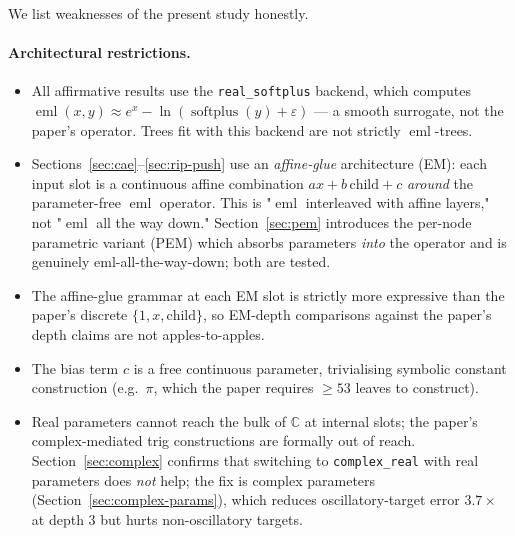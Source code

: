 \documentclass[11pt]{article}
\newcommand{\eml}{\operatorname{eml}}
\begin{document}
We list weaknesses of the present study honestly.

\paragraph{Architectural restrictions.}
\begin{itemize}
\item All affirmative results use the \texttt{real\_softplus} backend, which
  computes $\eml(x,y) \approx e^x - \ln(\operatorname{softplus}(y) + \varepsilon)$
  --- a smooth surrogate, not the paper's operator. Trees fit with this
  backend are not strictly $\eml$-trees.
\item Sections~\ref{sec:cae}--\ref{sec:rip-push} use an \emph{affine-glue}
  architecture (EM): each input slot is a continuous affine combination
  $a x + b\,\text{child} + c$ \emph{around} the parameter-free $\eml$ operator.
  This is "$\eml$ interleaved with affine layers," not "$\eml$ all the way
  down." Section~\ref{sec:pem} introduces the per-node parametric variant
  (PEM) which absorbs parameters \emph{into} the operator and is genuinely
  eml-all-the-way-down; both are tested.
\item The affine-glue grammar at each EM slot is strictly more expressive
  than the paper's discrete $\{1, x, \text{child}\}$, so EM-depth comparisons
  against the paper's depth claims are not apples-to-apples.
\item The bias term $c$ is a free continuous parameter, trivialising
  symbolic constant construction (e.g.\ $\pi$, which the paper requires
  $\geq 53$ leaves to construct).
\item Real parameters cannot reach the bulk of $\mathbb{C}$ at internal
  slots; the paper's complex-mediated trig constructions are formally
  out of reach. Section~\ref{sec:complex} confirms that switching to
  \texttt{complex\_real} with real parameters does \emph{not} help; the
  fix is complex parameters (Section~\ref{sec:complex-params}), which
  reduces oscillatory-target error $3.7\times$ at depth $3$ but hurts
  non-oscillatory targets.
\end{itemize}
\end{document}
